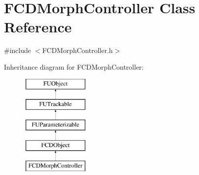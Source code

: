 \hypertarget{classFCDMorphController}{
\section{FCDMorphController Class Reference}
\label{classFCDMorphController}
}


{\ttfamily \#include $<$FCDMorphController.h$>$}

Inheritance diagram for FCDMorphController:\begin{figure}[H]
\begin{center}
\leavevmode
\includegraphics[height=5.000000cm]{classFCDMorphController}
\end{center}
\end{figure}

